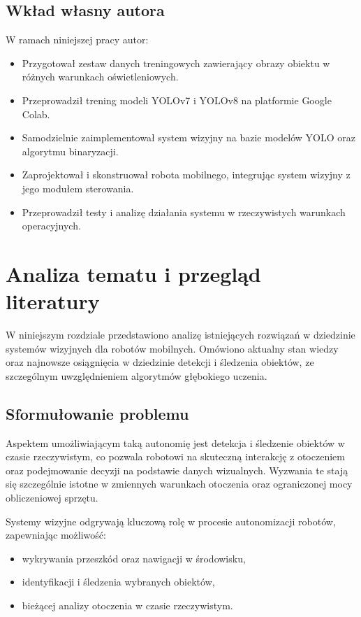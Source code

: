 \documentclass[a4paper,twoside,12pt]{book}
\begin{document}
\section{Wkład własny autora}
W ramach niniejszej pracy autor:
\begin{itemize}
    \item Przygotował zestaw danych treningowych zawierający obrazy obiektu w różnych warunkach oświetleniowych.
    \item Przeprowadził trening modeli YOLOv7 i YOLOv8 na platformie Google Colab.
    \item Samodzielnie zaimplementował system wizyjny na bazie modelów YOLO oraz algorytmu binaryzacji.
    \item Zaprojektował i skonstruował robota mobilnego, integrując system wizyjny z jego modułem sterowania.
    \item Przeprowadził testy i analizę działania systemu w rzeczywistych warunkach operacyjnych.
\end{itemize}


\chapter{Analiza tematu i przegląd literatury}

\label{ch:analiza}

W niniejszym rozdziale przedstawiono analizę istniejących rozwiązań w dziedzinie systemów wizyjnych dla robotów mobilnych. Omówiono aktualny stan wiedzy oraz najnowsze osiągnięcia w dziedzinie detekcji i śledzenia obiektów, ze szczególnym uwzględnieniem algorytmów głębokiego uczenia.

\section{Sformułowanie problemu}
Aspektem umożliwiającym taką autonomię jest detekcja i śledzenie obiektów w czasie rzeczywistym, co pozwala robotowi na skuteczną interakcję z otoczeniem oraz podejmowanie decyzji na podstawie danych wizualnych. Wyzwania te stają się szczególnie istotne w zmiennych warunkach otoczenia oraz ograniczonej mocy obliczeniowej sprzętu.

Systemy wizyjne odgrywają kluczową rolę w procesie autonomizacji robotów, zapewniając możliwość:
\begin{itemize}
    \item wykrywania przeszkód oraz nawigacji w środowisku,
    \item identyfikacji i śledzenia wybranych obiektów,
    \item bieżącej analizy otoczenia w czasie rzeczywistym.
\end{itemize}
\end{document}
